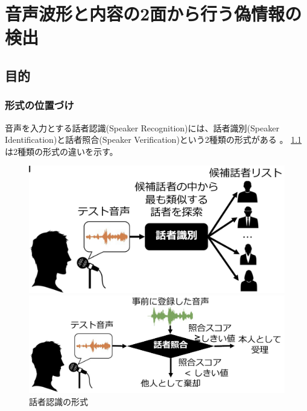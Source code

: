\chapter{音声波形と内容の2面から行う偽情報の検出}\label{ch:spc_cnt}
\section{目的}\label{sec:cnt_pur}
\subsection{形式の位置づけ}
音声を入力とする話者認識(Speaker Recognition)には、話者識別(Speaker Identification)と話者照合(Speaker Verification)という2種類の形式がある \cite{FURUI1997859,628714,5745552}。
\cref{fig:speaker_recog}は2種類の形式の違いを示す。

\begin{figure}[p]
    \centering
    \begin{minipage}{0.9\linewidth}
        \centering
        \includegraphics[width=0.8\linewidth]{figures/sd.png}
    \end{minipage}
    \begin{minipage}{0.9\linewidth}
        \centering
        \includegraphics[width=0.8\linewidth]{figures/sv.png}
    \end{minipage}
    \caption{話者認識の形式 \cite{俵直弘2022}}
    \label{fig:speaker_recog}
\end{figure}


